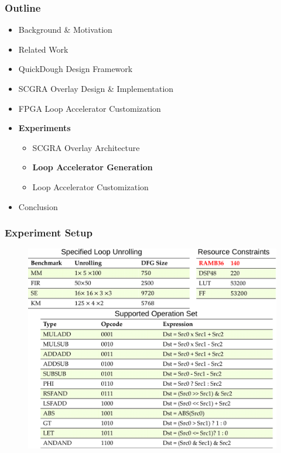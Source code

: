 \documentclass[accentcolor=tud1a,colorbacktitle,inverttitle,landscape,german,presentation,t]{tudbeamer}
\begin{document}
  \begin{frame}
  \frametitle{Outline}
  \begin{itemize}
  \setlength{\itemsep}{6pt}
  \item Background \& Motivation
  \item Related Work
  \item QuickDough Design Framework
  \item SCGRA Overlay Design \& Implementation
  \item FPGA Loop Accelerator Customization
  \item \textbf{Experiments}
  \begin{itemize}
    \setlength{\itemsep}{6pt}
    \item SCGRA Overlay Architecture
    \item \textbf{Loop Accelerator Generation}
    \item Loop Accelerator Customization
  \end{itemize}
  \item Conclusion
  \end{itemize}
  \end{frame}

  \begin{frame}
  \frametitle{Experiment Setup}
  \vspace{-1em}
  \begin{figure}
    \includegraphics[width=0.8\linewidth]{compile-setup}
  \end{figure}
  \end{frame}
\end{document}
